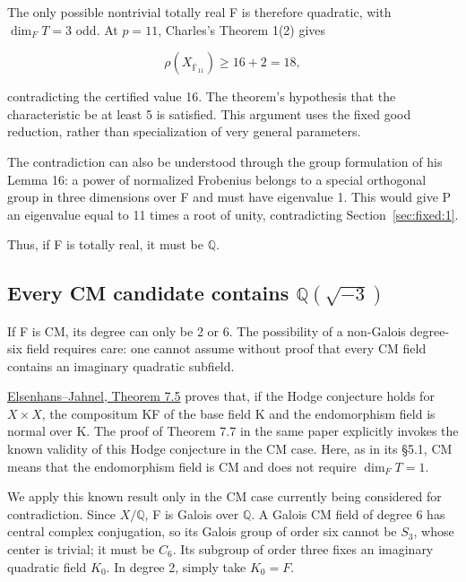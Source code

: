 \documentclass[11pt,a4paper,oneside]{article}
\theoremstyle{plain}
\theoremstyle{definition}
\theoremstyle{remark}
\numberwithin{equation}{section}
\begin{document}
The only possible nontrivial totally real F is therefore quadratic, with \(\dim_FT=3\) odd. At \(p=11\), Charles's Theorem 1(2) gives

\begin{equation}
\rho(X_{\overline{\mathbb F}_{11}})\ge16+2=18,
\end{equation}

contradicting the certified value 16. The theorem's hypothesis that the characteristic be at least 5 is satisfied. This argument uses the fixed good reduction, rather than specialization of very general parameters.

The contradiction can also be understood through the group formulation of his Lemma 16: a power of normalized Frobenius belongs to a special orthogonal group in three dimensions over F and must have eigenvalue 1. This would give P an eigenvalue equal to 11 times a root of unity, contradicting Section~\ref{sec:fixed:1}.

Thus, if F is totally real, it must be \(\mathbb Q\).


\subsection{\texorpdfstring{Every CM candidate contains \(\mathbb Q(\sqrt{-3})\)}{Every CM candidate contains \textbackslash mathbb Q(\textbackslash sqrt\{-3\})}}\label{sec:fixed:3}

If F is CM, its degree can only be 2 or 6. The possibility of a non-Galois degree-six field requires care: one cannot assume without proof that every CM field contains an imaginary quadratic subfield.

\href{https://wwwuser.gwdguser.de/~jjahnel/Arbeiten/Komponentengruppe_v4f.pdf}{Elsenhans--Jahnel, Theorem 7.5} proves that, if the Hodge conjecture holds for \(X\times X\), the compositum KF of the base field K and the endomorphism field is normal over K. The proof of Theorem 7.7 in the same paper explicitly invokes the known validity of this Hodge conjecture in the CM case. Here, as in its §5.1, CM means that the endomorphism field is CM and does not require \(\dim_FT=1\).

We apply this known result only in the CM case currently being considered for contradiction. Since \(X/\mathbb Q\), F is Galois over \(\mathbb Q\). A Galois CM field of degree 6 has central complex conjugation, so its Galois group of order six cannot be \(S_3\), whose center is trivial; it must be \(C_6\). Its subgroup of order three fixes an imaginary quadratic field \(K_0\). In degree 2, simply take \(K_0=F\).
\end{document}
